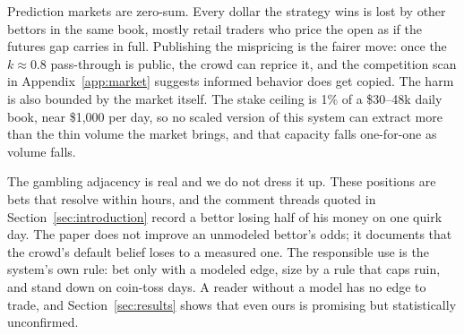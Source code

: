 Prediction markets are zero-sum. Every dollar the strategy wins is lost by
other bettors in the same book, mostly retail traders who price the open as
if the futures gap carries in full. Publishing the mispricing is the fairer
move: once the $k \approx 0.8$ pass-through is public, the crowd can
reprice it, and the competition scan in Appendix~\ref{app:market}
suggests informed behavior does get copied. The harm is also bounded by the
market itself. The stake ceiling is 1\% of a \$30--48k daily book, near
\$1{,}000 per day, so no scaled version of this system can extract more
than the thin volume the market brings, and that capacity falls one-for-one
as volume falls.

The gambling adjacency is real and we do not dress it up. These positions
are bets that resolve within hours, and the comment threads quoted in
Section~\ref{sec:introduction} record a bettor losing half of his money on
one quirk day. The paper does not improve an unmodeled bettor's odds; it
documents that the crowd's default belief loses to a measured one. The responsible use is the system's own rule: bet only with a modeled
edge, size by a rule that caps ruin, and stand down on coin-toss days. A
reader without a model has no edge to trade, and Section~\ref{sec:results}
shows that even ours is promising but statistically unconfirmed.
